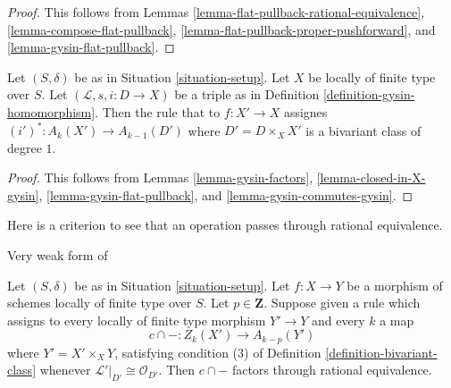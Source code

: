 \begin{proof}
This follows from
Lemmas \ref{lemma-flat-pullback-rational-equivalence},
\ref{lemma-compose-flat-pullback},
\ref{lemma-flat-pullback-proper-pushforward}, and
\ref{lemma-gysin-flat-pullback}.
\end{proof}

\begin{lemma}
\label{lemma-gysin-bivariant}
Let $(S, \delta)$ be as in Situation \ref{situation-setup}.
Let $X$ be locally of finite type over $S$.
Let $(\mathcal{L}, s, i : D \to X)$ be a triple as in
Definition \ref{definition-gysin-homomorphism}.
Then the rule that to $f : X' \to X$ assignes
$(i')^* : A_k(X') \to A_{k - 1}(D')$ where $D' = D \times_X X'$
is a bivariant class of degree $1$.
\end{lemma}

\begin{proof}
This follows from Lemmas \ref{lemma-gysin-factors},
\ref{lemma-closed-in-X-gysin},
\ref{lemma-gysin-flat-pullback}, and
\ref{lemma-gysin-commutes-gysin}.
\end{proof}

\noindent
Here is a criterion to see that an operation
passes through rational equivalence.

\begin{lemma}
\label{lemma-factors-through-rational-equivalence}
\begin{reference}
Very weak form of \cite[Theorem 17.1]{F}
\end{reference}
Let $(S, \delta)$ be as in Situation \ref{situation-setup}.
Let $f : X \to Y$ be a morphism of schemes locally of finite type over $S$.
Let $p \in \mathbf{Z}$. Suppose given a rule
which assigns to every locally of finite type morphism $Y' \to Y$
and every $k$ a map
$$
c \cap - : Z_k(X') \longrightarrow A_{k - p}(Y')
$$
where $Y' = X' \times_X Y$, satisfying condition (3) of
Definition \ref{definition-bivariant-class}
whenever $\mathcal{L}'|_{D'} \cong \mathcal{O}_{D'}$. Then
$c \cap -$ factors through rational equivalence.
\end{lemma}

